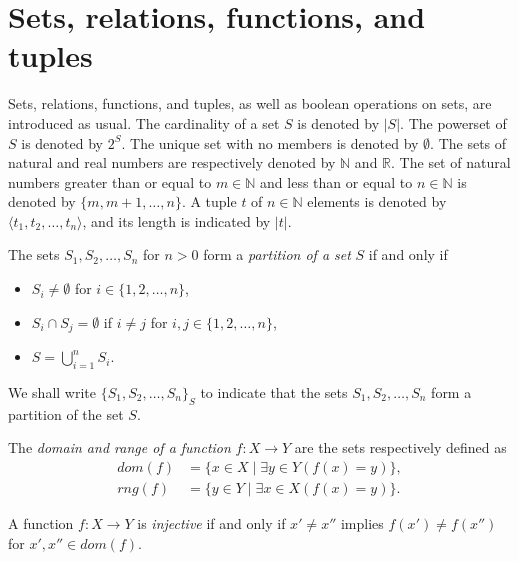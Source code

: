 \section{Sets, relations, functions, and tuples}

Sets, relations, functions, and tuples, as well as boolean operations on sets, are
introduced as usual. The cardinality of a set $S$ is denoted by $|S|$. The powerset
of $S$ is denoted by $2^S$. The unique set with no members is denoted by $\emptyset$.
The sets of natural and real numbers are respectively denoted by $\mathbb{N}$ and
$\mathbb{R}$. The set of natural numbers greater than or equal to $m \in
\mathbb{N}$ and less than or equal to $n \in \mathbb{N}$ is denoted by $\{ m, m+1,
\ldots, n \}$. A tuple $t$ of $n \in \mathbb{N}$ elements is denoted by $\langle t_1,
t_2, \ldots, t_n \rangle$, and its length is indicated by $|t|$.

\begin{definition}
  The sets $S_1, S_2, \ldots, S_n$ for $n > 0$ form a \emph{partition of a set} $S$
  if and only if
  \begin{itemize}
    \item $S_i \neq \emptyset$ for $i \in \{ 1, 2, \ldots, n \}$,
    \item $S_i \cap S_j = \emptyset$ if $i \neq j$ for $i, j \in \{ 1, 2, \ldots, n
	    \}$,
    \item $S = \bigcup_{i=1}^n S_i$.
  \end{itemize}
\end{definition}

We shall write ${\{ S_1, S_2, \ldots, S_n \}}_S$ to indicate that the sets $S_1, S_2,
\ldots, S_n$ form a partition of the set $S$.

\begin{definition}
  The \emph{domain and range of a function} $f: X \rightarrow Y$ are the sets
  respectively defined as
  \begin{align*}
    dom(f) & = \{ x \in X \mid \exists y \in Y (f(x) = y) \}, \\
    rng(f) & = \{ y \in Y \mid \exists x \in X (f(x) = y) \}.
  \end{align*}
\end{definition}

\begin{definition}
  A function $f: X \rightarrow Y$ is \emph{injective} if and only if $x' \neq x''$
  implies $f(x') \neq f(x'')$ for $x', x'' \in dom(f)$.
\end{definition}

